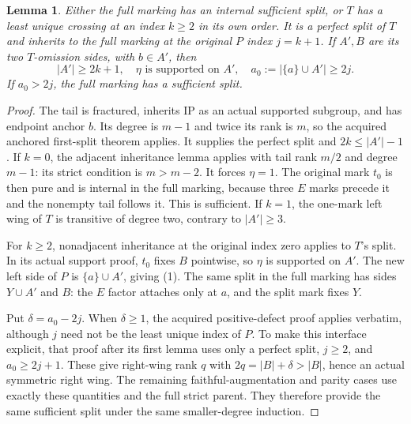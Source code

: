 \documentclass[11pt,a4paper]{article}
\newtheorem{lemma}{Lemma}\newtheorem{theorem}[lemma]{Theorem}
\begin{document}
\begin{lemma}\label{tail}
Either the full marking has an internal sufficient split, or $T$
has a least unique crossing at an index $k\ge2$ in its own order.
It is a perfect split of $T$ and inherits to the full marking
at the original $P$ index $j=k+1$. If $A',B$ are its two
$T$-omission sides, with $b\in A'$, then
\[
 |A'|\ge 2k+1,\quad
 \eta\text{ is supported on }A',\quad
 a_0:=|\{a\}\cup A'|\ge 2j.
                                                        \tag{1}
\]
If $a_0>2j$, the full marking has a sufficient split.
\end{lemma}
\begin{proof}
The tail is fractured, inherits IP as an actual supported subgroup,
and has endpoint anchor $b$. Its degree is $m-1$ and twice its
rank is $m$, so the acquired anchored first-split theorem applies.
It supplies the perfect split and $2k\le |A'|-1$.
If $k=0$, the adjacent inheritance lemma applies with tail rank
$m/2$ and degree $m-1$: its strict condition is $m>m-2$.
It forces $\eta=1$. The original mark $t_0$ is then pure and
is internal in the full marking, because three $E$ marks precede
it and the nonempty tail follows it. This is sufficient.
If $k=1$, the one-mark left wing of $T$ is transitive of
degree two, contrary to $|A'|\ge3$.

For $k\ge2$, nonadjacent inheritance at the original index zero
applies to $T$'s split. In its actual support proof, $t_0$ fixes
$B$ pointwise, so $\eta$ is supported on $A'$. The new left
side of $P$ is $\{a\}\cup A'$, giving (1).
The same split in the full marking has sides $Y\cup A'$ and
$B$: the $E$ factor attaches only at $a$, and the split mark
fixes $Y$.

Put $\delta=a_0-2j$. When $\delta\ge1$, the acquired
positive-defect proof applies verbatim, although $j$ need not
be the least unique index of $P$. To make this interface explicit,
that proof after its first lemma uses only a perfect split, $j\ge2$,
and $a_0\ge2j+1$. These give right-wing rank $q$ with
$2q=|B|+\delta>|B|$, hence an actual symmetric right wing.
The remaining faithful-augmentation and parity cases use exactly
these quantities and the full strict parent. They therefore provide
the same sufficient split under the same smaller-degree induction.
\end{proof}
\end{document}
